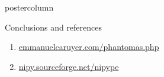 \documentclass[final,hyperref={pdfpagelabels=false}]{beamer}
\newlength{\columnheight}
\begin{document}
\begin{frame}[t]
{\begin{minipage}[t][\columnheight][c]{0.95\textwidth}
{\begin{columns}[T,totalwidth=\textwidth]
\begin{column}{.64\textwidth}
\begin{beamercolorbox}[center,wd=\textwidth]{postercolumn}
\begin{minipage}[T]{.95\textwidth}
{\begin{block}{Conclusions and references}
            \par
            \begin{enumerate}
            \item {\small\url{emmanuelcaruyer.com/phantomas.php}}\par
            \item {\small\url{nipy.sourceforge.net/nipype}}
            \end{enumerate}
          \end{block}
          }
        \end{minipage}
      \end{beamercolorbox}
    \end{column}
  \end{columns}
  }
  \end{minipage}
}
\end{frame}
\end{document}
